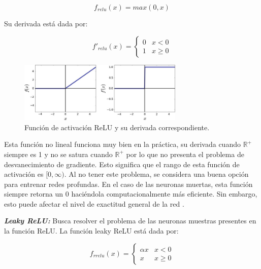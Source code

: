 \begin{equation}
    f_{relu}(x) = max(0,x)
\end{equation}

Su derivada está dada por:

\begin{equation}
    {f}'_{relu}(x) = \left\{\begin{matrix}
        0 & x < 0         \\
        1 & x \geqslant 0
    \end{matrix}\right.
\end{equation}

\begin{figure}[H]
    \begin{center}
        \includegraphics[width=0.7\textwidth]{Images/relu.png}
    \end{center}
    \caption{Función de activación ReLU y su derivada correspondiente.}
    \label{fig:relu}
\end{figure}

Esta función no lineal funciona muy bien en la práctica, su derivada cuando $ \mathbb{R}^{+}$ siempre es 1 y no se satura cuando $ \mathbb{R}^{+}$ por lo que no presenta el problema de desvanecimiento de gradiente. Esto significa que el rango de esta función de activación es $[0, \infty)$. Al no tener este problema, se considera una buena opción para entrenar redes profundas. En el caso de las neuronas muertas, esta función siempre retorna un 0 haciéndola computacionalmente más eficiente. Sin embargo, esto puede afectar el nivel de exactitud general de la red \cite{aghdam2017guide}.

\textbf{\textit{Leaky ReLU:}} Busca resolver el problema de las neuronas muestras presentes en la función ReLU. La función leaky ReLU está dada por:

\begin{equation}
    {f}_{rrelu}(x) = \left\{\begin{matrix}
        \alpha x & x < 0         \\
        x        & x \geqslant 0
    \end{matrix}\right.
\end{equation}

